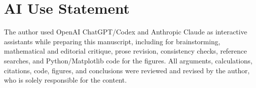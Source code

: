 \documentclass[aps,prd,10pt,onecolumn,nofootinbib,superscriptaddress,floatfix]{revtex4-2}
\begin{document}
\section*{AI Use Statement}

The author used OpenAI ChatGPT/Codex and Anthropic Claude as interactive
assistants while preparing this manuscript, including for brainstorming,
mathematical and editorial critique, prose revision, consistency checks,
reference searches, and Python/Matplotlib code for the figures.  All arguments,
calculations, citations, code, figures, and conclusions were reviewed and
revised by the author, who is solely responsible for the content.



\end{document}
